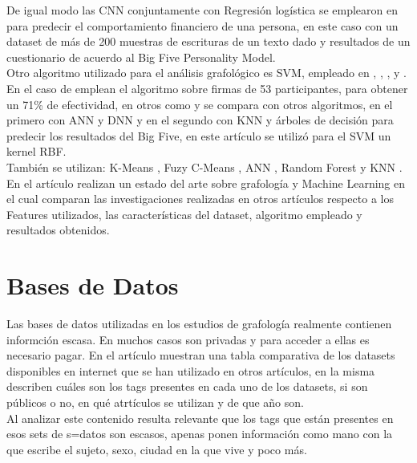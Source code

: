 \documentclass[10pt, a4paper]{article}
\begin{document}
        De igual modo las CNN conjuntamente con Regresi\'on log\'istica se emplearon en \cite{4} para predecir el comportamiento financiero de una persona, en este caso con un dataset de más de 200 muestras de escrituras de un texto dado y resultados de un cuestionario de acuerdo al Big Five Personality Model.\\ 

        Otro algoritmo utilizado para el an\'alisis grafol\'ogico es SVM, empleado en \cite{2}, \cite{5}, \cite{6}, \cite{7} y \cite{8}. En el caso de \cite{6} emplean el algoritmo sobre firmas de 53 participantes, para obtener un 71\% de efectividad, 
        en otros como \cite{5} y \cite{8} se compara con otros algoritmos, en el primero con ANN y DNN y en el segundo con KNN y \'arboles de decisi\'on para predecir los resultados del Big Five, en este art\'iculo se utiliz\'o para el SVM un kernel RBF.\\ 

        Tambi\'en se utilizan: K-Means \cite{9}, Fuzy C-Means \cite{10}, ANN \cite{11,5,12,9}, Random Forest \cite{13, 14} y KNN \cite{14,9,8}.\\

        En el art\'iculo \cite{18} realizan un estado del arte sobre grafolog\'ia y Machine Learning en el cual comparan las investigaciones realizadas en 
        otros art\'iculos respecto a los Features utilizados, las caracter\'isticas del dataset, algoritmo empleado y resultados obtenidos.

    \section{Bases de Datos}

        Las bases de datos utilizadas en los estudios de grafolog\'ia realmente contienen informci\'on escasa. En muchos casos 
        son privadas y para acceder a ellas es necesario pagar. En el art\'iculo \cite{14} muestran una tabla comparativa de los datasets disponibles en 
        internet que se han utilizado en otros art\'iculos, en la misma describen cu\'ales son los tags presentes en cada uno de los datasets, si son p\'ublicos o no, en qu\'e atrt\'iculos se utilizan y 
        de que a\~no son. \\ 

        Al analizar este contenido resulta relevante que los tags que est\'an presentes en esos sets de s=datos son escasos, apenas ponen informaci\'on como mano con la que escribe el sujeto, sexo, 
        ciudad en la que vive y poco m\'as. \\ 
\end{document}
